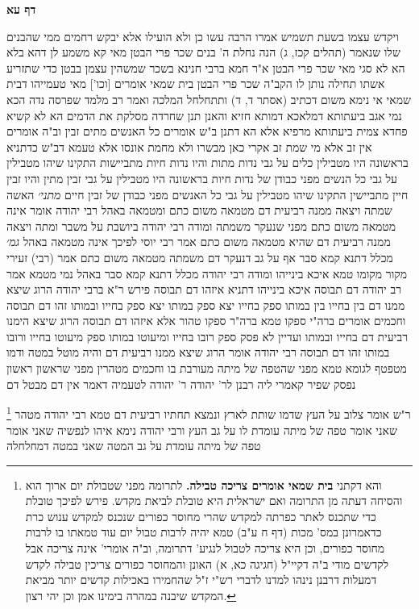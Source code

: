 \documentclass[12pt, openany]{book}
\newcommand{\sethebfont}{
\fontsize{10.5pt}{21.0pt} \selectfont
}
\newcommand{\twocol}[1]{
	{\sethebfont \begin{multicols}{2}
			#1
	\end{multicols}}	
}
\newcommand{\sectname}{}
\newcommand{\newsection}[1]{
	\addcontentsline{toc}{section}{#1}
	\renewcommand{\sectname}{#1}	
	\vspace{-\baselineskip}
	\begin{center}
		\textbf{%
\fontsize{16pt}{16pt}\selectfont
			#1}
	\end{center}
	\vspace{-\baselineskip}
	\nopagebreak
}
\newcommand{\footnotecomment}[1]{
	\renewcommand\thefootnote{}
	\footnote{#1}}
\newcommand{\commenta}[1]{\footnotecomment{#1}}
\begin{document}
\newsection{דף עא}
\twocol{ויקדש עצמו בשעת תשמיש 
אמרו הרבה עשו כן ולא הועילו אלא יבקש רחמים ממי שהבנים שלו שנאמר (תהלים קכז, ג) הנה נחלת ה' בנים שכר פרי הבטן 
מאי קא משמע לן דהא בלא הא לא סגי 
מאי שכר פרי הבטן א"ר חמא ברבי חנינא בשכר שמשהין עצמן בבטן כדי שתזריע אשתו תחילה נותן לו הקב"ה שכר פרי הבטן
בית שמאי אומרים [וכו'] מאי טעמייהו דבית שמאי אי נימא משום דכתיב (אסתר ד, ד) ותתחלחל המלכה ואמר רב מלמד שפרסה נדה הכא נמי אגב ביעתותא דמלאכא דמותא חזיא והאנן תנן שחרדה מסלקת את הדמים הא לא קשיא פחדא צמית ביעתותא מרפיא 
אלא הא דתנן ב"ש אומרים כל האנשים מתים זבין וב"ה אומרים אין זב אלא מי שמת זב 
אקרי כאן מבשרו ולא מחמת אונסו 
אלא טעמא דב"ש כדתניא בראשונה היו מטבילין כלים על גבי נדות מתות והיו נדות חיות מתביישות התקינו שיהו מטבילין על גבי כל הנשים מפני כבודן של נדות חיות 
בראשונה היו מטבילין על גבי זבין מתין והיו זבין חיין מתביישין התקינו שיהו מטבילין על גבי כל האנשים מפני כבודן של זבין חיים
{\large\emph{מתני׳}} האשה שמתה ויצאה ממנה רביעית דם מטמאה משום כתם ומטמאה באהל
רבי יהודה אומר אינה מטמאה משום כתם מפני שנעקר משמתה ומודה רבי יהודה ביושבת על משבר ומתה ויצאה ממנה רביעית דם שהיא מטמאה משום כתם אמר רבי יוסי לפיכך אינה מטמאה באהל
{\large\emph{גמ׳}} מכלל דתנא קמא סבר אף על גב דנעקר דם משמתה מטמאה משום כתם 
אמר (רבי) זעירי מקור מקומו טמא איכא בינייהו
ומודה רבי יהודה
מכלל דתנא קמא סבר באהל נמי מטמא אמר רב יהודה דם תבוסה איכא בינייהו 
דתניא איזהו דם תבוסה פירש ר"א ברבי יהודה הרוג שיצא ממנו דם בין בחייו בין במותו ספק בחייו יצא ספק במותו יצא ספק בחייו ובמותו זהו דם תבוסה 
וחכמים אומרים ברה"י ספקו טמא ברה"ר ספקו טהור 
אלא איזהו דם תבוסה הרוג שיצא הימנו רביעית דם בחייו ובמותו ועדיין לא פסק ספק רובו בחייו ומיעוטו במותו ספק מיעוטו בחייו ורובו במותו זהו דם תבוסה 
רבי יהודה אומר הרוג שיצא ממנו רביעית דם והיה מוטל במטה ודמו מטפטף לגומא טמא מפני שהטפה של מיתה מעורבת בו וחכמים מטהרין מפני
שראשון ראשון נפסק שפיר קאמרי ליה רבנן לר' יהודה ר' יהודה לטעמיה דאמר אין דם מבטל דם 
\commenta{והא דקתני \textbf{בית שמאי אומרים צריכה טבילה.} לתרומה מפני שטבולת יום ארוך הוא והסיחה דעתה מן התרומה ואם ישראלית היא טובלת לביאת מקדש. פירש לפיכך טובלת כדי שתכנס לאתר כפרתה למקדש שהרי מחוסר כפורים שנכנס למקדש ענוש כרת כדאמרונן במס' מכות (דף ח ע"ב) טמא יהיה לרבות טבול יום עוד טמאתו בו לרבות מחוסר כפורים, וכן היא צריכה לטבול לנגיע' דתרומה, וב"ה אומרי' אינה צריכה אבל לקדשים מודי ב"ה דקיי"ל (חגיגה כא, א) האונן והמחוסר כפורים צריכין טבילה לקדש דמעלות דרבנן נינהו למדנו לדברי רש"י ז"ל שהחמירו באכילות קדשים יותר מביאת המקדש שיבנה במהרה בימינו אמן וכן יהי רצון. }
ר"ש אומר צלוב על העץ שדמו שותת לארץ ונמצא תחתיו רביעית דם טמא רבי יהודה מטהר שאני אומר טפה של מיתה עומדת לו על גב העץ 
ורבי יהודה נימא איהו לנפשיה שאני אומר טפה של מיתה עומדת על גב המטה שאני במטה דמחלחלה
}
\end{document}
